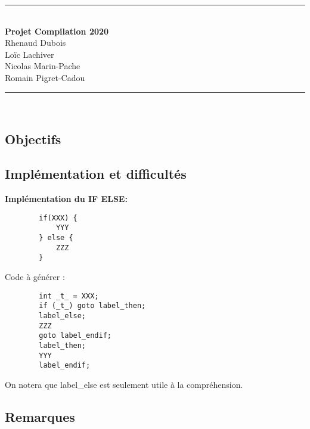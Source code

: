 \documentclass[12pt, a4paper]{article}
\begin{document}


\begin{center}
    \rule{\linewidth}{0.5mm} \\
    \Large\textbf{Projet Compilation 2020\\}
    Rhenaud Dubois\\
    Loïc Lachiver\\
    Nicolas Marin-Pache\\
    Romain Pigret-Cadou
    
    \rule{\linewidth}{0.5mm} \\
\end{center}



\subsection*{Objectifs}


\subsection*{Implémentation et difficultés}
\textbf{Implémentation du IF ELSE:}

\begin{codequote}
    \begin{verbatim}
        if(XXX) {
            YYY
        } else {
            ZZZ
        }
    \end{verbatim}
\end{codequote}
Code à générer :\\
\begin{codequote}
    \begin{verbatim}
        int _t_ = XXX;
        if (_t_) goto label_then;
        label_else;
        ZZZ
        goto label_endif;
        label_then;
        YYY
        label_endif;
    \end{verbatim}
\end{codequote}
On notera que label\_else est seulement utile à la compréhension.




\subsection*{Remarques}
\end{document}
